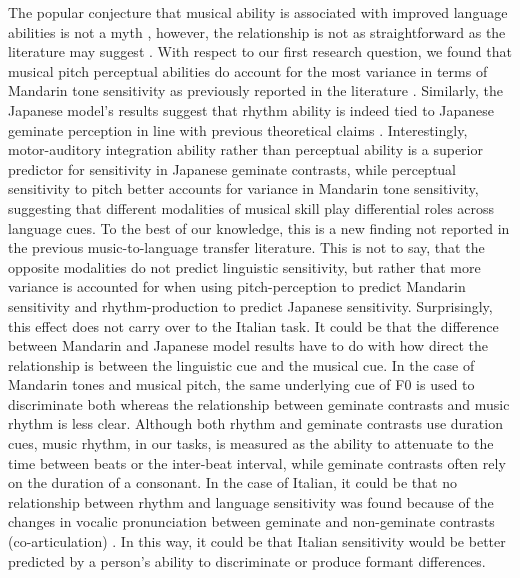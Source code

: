 \documentclass[a4paper]{article}
\begin{document}
The popular conjecture that musical ability is associated with improved language abilities is not a myth \cite{Slevc_Miyake_2006b}, however, the relationship is not as straightforward as the literature may suggest \cite{neves_et_al_2022_music}. With respect to our first research question, we found that musical pitch perceptual abilities do account for the most variance in terms of Mandarin tone sensitivity as previously reported in the literature \cite{zheng_et_al_2018_pitch}. Similarly, the Japanese model's results suggest that rhythm ability is indeed tied to Japanese geminate perception in line with previous theoretical claims \cite{lofqvist_2017_effect}. Interestingly, motor-auditory integration ability rather than perceptual ability is a superior predictor for sensitivity in Japanese geminate contrasts, while perceptual sensitivity to pitch better accounts for variance in Mandarin tone sensitivity, suggesting that different modalities of musical skill play differential roles across language cues. To the best of our knowledge, this is a new finding not reported in the previous music-to-language transfer literature. This is not to say, that the opposite modalities do not predict linguistic sensitivity, but rather that more variance is accounted for when using pitch-perception to predict Mandarin sensitivity and rhythm-production to predict Japanese sensitivity. Surprisingly, this effect does not carry over to the Italian task. It could be that the difference between Mandarin and Japanese model results have to do with how direct the relationship is between the linguistic cue and the musical cue. In the case of Mandarin tones and musical pitch, the same underlying cue of F0 is used to discriminate both whereas the relationship between geminate contrasts and music rhythm is less clear. Although both rhythm and geminate contrasts use duration cues, music rhythm, in our tasks, is measured as the ability to attenuate to the time between beats or the inter-beat interval, while geminate contrasts often rely on the duration of a consonant. In the case of Italian, it could be that no relationship between rhythm and language sensitivity was found because of the changes in vocalic pronunciation between geminate and non-geminate contrasts (co-articulation) \cite{Tsukada_Cox_Hajek_Hirata_2017}. In this way, it could be that Italian sensitivity would be better predicted by a person's ability to discriminate or produce formant differences. 
\end{document}
